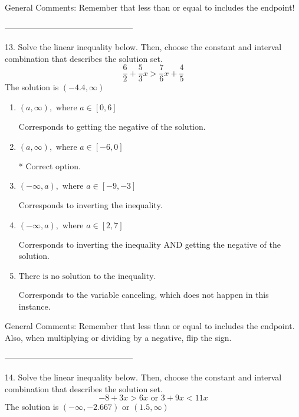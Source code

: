 \documentclass{article}[10pt]
\begin{document}
General Comments: Remember that less than or equal to includes the endpoint!

-----------------------------------------------

13. Solve the linear inequality below. Then, choose the constant and interval combination that describes the solution set.
$$ \frac{6}{2} + \frac{5}{3} x > \frac{7}{6} x + \frac{4}{5} $$ 
The solution is $ (-4.4, \infty) $ 

\begin{enumerate}[label=\Alph*.] 
\item $ (a, \infty), \text{ where } a \in [0, 6] $ 

 Corresponds to getting the negative of the solution. 
\item $ (a, \infty), \text{ where } a \in [-6, 0] $ 

  * Correct option. 
\item $ (-\infty, a), \text{ where } a \in [-9, -3] $ 

 Corresponds to inverting the inequality. 
\item $ (-\infty, a), \text{ where } a \in [2, 7] $ 

 Corresponds to inverting the inequality AND getting the negative of the solution. 
\item $ \text{There is no solution to the inequality.} $ 

 Corresponds to the variable canceling, which does not happen in this instance. 
\end{enumerate} 
 
General Comments: Remember that less than or equal to includes the endpoint. Also, when multiplying or dividing by a negative, flip the sign.

-----------------------------------------------

14. Solve the linear inequality below. Then, choose the constant and interval combination that describes the solution set.
$$ -8 + 3 x > 6 x \text{ or } 3 + 9 x < 11 x $$ 
The solution is $ (-\infty, -2.667) \text{ or } (1.5, \infty) $ 
\end{document}
